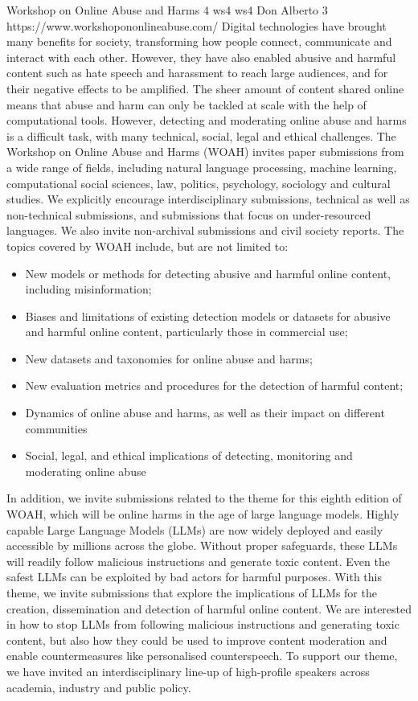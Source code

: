 \begin{wsschedulenolist}
{Workshop on Online Abuse and Harms}
{4}
{ws4}
{ws4}
{Don Alberto 3}
{https://www.workshopononlineabuse.com/}
    Digital technologies have brought many benefits for society, transforming how people connect, communicate and interact with each other. However, they have also enabled abusive and harmful content such as hate speech and harassment to reach large audiences, and for their negative effects to be amplified. The sheer amount of content shared online means that abuse and harm can only be tackled at scale with the help of computational tools. However, detecting and moderating online abuse and harms is a difficult task, with many technical, social, legal and ethical challenges. The Workshop on Online Abuse and Harms (WOAH) invites paper submissions from a wide range of fields, including natural language processing, machine learning, computational social sciences, law, politics, psychology, sociology and cultural studies. We explicitly encourage interdisciplinary submissions, technical as well as non-technical submissions, and submissions that focus on under-resourced languages. We also invite non-archival submissions and civil society reports. The topics covered by WOAH include, but are not limited to:

\begin{itemize}
    \setlength{\itemsep}{-0.3ex}
    \item New models or methods for detecting abusive and harmful online content, including misinformation;
    \item Biases and limitations of existing detection models or datasets for abusive and harmful online content, particularly those in commercial use;
    \item New datasets and taxonomies for online abuse and harms;
    \item New evaluation metrics and procedures for the detection of harmful content;
    \item Dynamics of online abuse and harms, as well as their impact on different communities
    \item Social, legal, and ethical implications of detecting, monitoring and moderating online abuse
\end{itemize}

In addition, we invite submissions related to the theme for this eighth edition of WOAH, which will be online harms in the age of large language models. Highly capable Large Language Models (LLMs) are now widely deployed and easily accessible by millions across the globe. Without proper safeguards, these LLMs will readily follow malicious instructions and generate toxic content. Even the safest LLMs can be exploited by bad actors for harmful purposes. With this theme, we invite submissions that explore the implications of LLMs for the creation, dissemination and detection of harmful online content. We are interested in how to stop LLMs from following malicious instructions and generating toxic content, but also how they could be used to improve content moderation and enable countermeasures like personalised counterspeech. To support our theme, we have invited an interdisciplinary line-up of high-profile speakers across academia, industry and public policy.
\end{wsschedulenolist}
